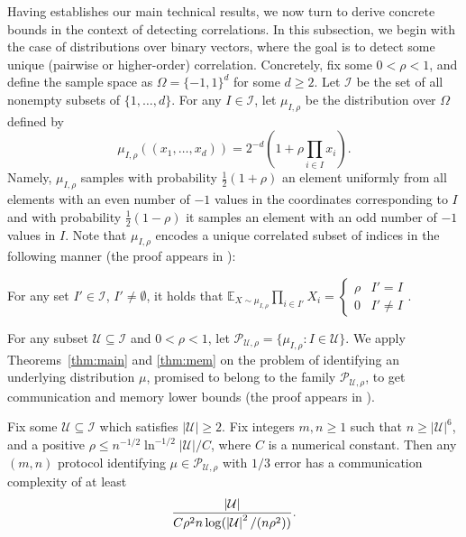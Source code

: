 Having establishes our main technical results, we now turn to derive concrete bounds in the context of detecting correlations. In this subsection, we begin with the case of distributions over binary vectors, where the goal is to detect some unique (pairwise or higher-order) correlation. Concretely, fix some $0<\rho<1$, and define the sample space as $\Omega = \{-1,1\}^d$ for some $d \ge 2$. Let $\mathcal{I}$ be the set of all nonempty subsets of $\{1,\dots,d\}$. For any $I \in \mathcal{I}$, let $\mu_{I,\rho}$ be the distribution over $\Omega$ defined by 
\[
\mu_{I,\rho}((x_1,\dots,x_d)) = 2^{-d} (1 + \rho \prod_{i\in I} x_i).
\]
Namely, $\mu_{I,\rho}$ samples with probability $\frac{1}{2}(1+\rho)$ an element uniformly from all elements with an even number of $-1$ values in the coordinates corresponding to $I$ and with probability $\frac{1}{2}(1-\rho)$ it samples an element with an odd number of $-1$ values in $I$.
Note that $\mu_{I,\rho}$ encodes a unique correlated subset of indices in the following manner (the proof appears in ): 
\begin{lemma} \label{lem:biased-subset}
For any set $I' \in \mathcal{I}$, $I' \ne \emptyset$, it holds that
$
\mathbb{E}_{X\sim \mu_{I,\rho}} \prod_{i\in I'} X_i = \begin{cases}
\rho & I' = I \\
0 & I' \ne I
\end{cases}
$.
\end{lemma}

For any subset $\mathcal{U} \subseteq \mathcal{I}$ and $0 < \rho < 1$, let $\mathcal{P}_{\mathcal{U},\rho} = \{ \mu_{I,\rho} \colon I \in \mathcal{U}\}$.
We apply Theorems~\ref{thm:main} and \ref{thm:mem} on the problem of identifying an underlying distribution $\mu$, promised to belong to the family $\mathcal{P}_{\mathcal{U},\rho}$, to get communication and memory lower bounds (the proof appears in ).

\begin{theorem} \label{thm:subset-parity}
Fix some $\mathcal{U} \subseteq \mathcal{I}$ which satisfies $\lvert \mathcal{U} \rvert \ge 2$. Fix integers $m,n\geq 1$ such that $n \ge \lvert \mathcal{U} \rvert^6$, and a positive $\rho \le n^{-1/2} \ln^{-1/2} \lvert \mathcal{U} \rvert/C$, where $C$ is a numerical constant. Then any $(m,n)$ protocol identifying  $\mu \in \mathcal{P}_{\mathcal{U},\rho}$ with $1/3$ error has a communication complexity of at least
\[ \frac{\left\lvert\mathcal{U}\right\rvert}{C \rho^2 n \log (\left\lvert\mathcal{U}\right\rvert^2 /(n\rho^2))}. \]
\end{theorem}

